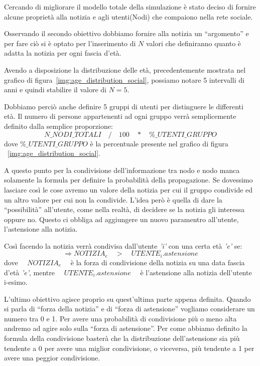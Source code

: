Cercando di migliorare il modello totale della simulazione è stato deciso di fornire alcune proprietà alla notizia e 
agli utenti(Nodi) che compaiono nella rete sociale.

Osservando il secondo obiettivo dobbiamo fornire alla notizia un ``argomento'' e per fare ciò si 
è optato per l'inserimento di $N$ valori che definiranno quanto è adatta la notizia per ogni fascia d'età.

Avendo a disposizione la distribuzione delle età, precedentemente mostrata nel grafico di figura~\ref{img:age_distribution_social},
possiamo notare 5 intervalli di anni e quindi stabilire il valore di $N = 5$.

Dobbiamo perciò anche definire 5 gruppi di utenti per distinguere le differenti età.
Il numero di persone appartenenti ad ogni gruppo verrà semplicemente definito dalla semplice proporzione:
\begin{equation*}
N\_NODI\_TOTALI \quad / \quad 100 \quad * \quad \%\_UTENTI\_GRUPPO
\end{equation*}
dove $\%\_UTENTI\_GRUPPO$ è la percentuale presente nel grafico di figura ~\ref{img:age_distribution_social}.

A questo punto per la condivisione dell'informazione tra nodo e nodo manca solamente la formula per definire la probabilità 
della propagazione.
Se dovessimo lasciare così le cose avremo un valore della notizia per cui il gruppo condivide ed un altro 
valore per cui non la condivide.
L'idea però è quella di dare la ``possibilità'' all'utente, come nella realtà, di decidere se la 
notizia gli interessa oppure no. 
Questo ci obbliga ad aggiungere un nuovo paramentro all'utente, l'astensione alla notizia.

Così facendo la notizia verrà condivisa dall'utente \emph{'i'} con una certa età \emph{'e'} se:
\begin{equation*}
\Rightarrow NOTIZIA_e \quad > \quad UTENTE_i.astensione
\end{equation*}
dove $\quad NOTIZIA_e \quad$ è la forza di condivisione della notizia su una data fascia d'età \emph{'e'}, 
mentre $\quad UTENTE_i.astensione \quad$ è l'astensione alla notizia dell'utente i-esimo.

L'ultimo obiettivo agisce proprio su quest'ultima parte appena definita.
Quando si parla di ``forza della notizia'' e di ``forza di astensione'' vogliamo considerare un numero tra 0 e 1.
Per avere una probabilità di condivisione più o meno alta andremo ad agire solo sulla ``forza di astensione''.
Per come abbiamo definito la formula della condivisione basterà che la distribuzione dell'astensione sia più 
tendente a 0 per avere una miglior condivisione, o viceversa, più tendente a 1 per avere una peggior
condivisione.


